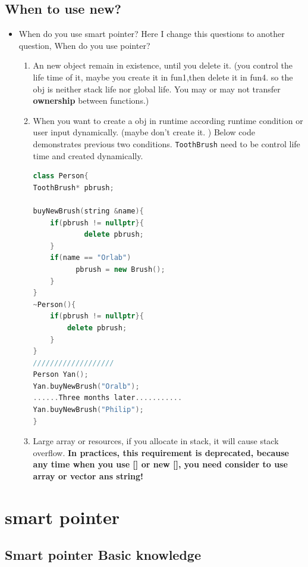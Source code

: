 \documentclass[a4paper,12pt,twoside]{book}
\begin{document}
\subsection{When to use new?}
\begin{itemize}

\item When do you use smart pointer? Here I change this questions to another question, When do you use pointer?
\begin{enumerate}

\item An new object remain in existence, until you delete it. (you control the life time of it, maybe you create it in fun1,then delete it in fun4. so the obj is neither stack life nor global life. You may or may not transfer \textbf{ownership} between functions.)

\item When you want to create a obj in runtime according runtime condition or user input dynamically. (maybe don't create it. ) Below code demonstrates previous two conditions.  \texttt{ToothBrush} need to be control life time and created dynamically.

\begin{lstlisting}[frame=single, language=c++]
class Person{
ToothBrush* pbrush;

buyNewBrush(string &name){
    if(pbrush != nullptr}{
	    	delete pbrush;
    }
    if(name == "Orlab")
          pbrush = new Brush();
    }
}
~Person(){
	if(pbrush != nullptr}{
		delete pbrush;
    }
}
///////////////////
Person Yan();
Yan.buyNewBrush("Oralb");
......Three months later...........
Yan.buyNewBrush("Philip");
}
\end{lstlisting}

\item Large array or resources,  if you allocate in stack, it will cause stack overflow. \textbf{In practices, this requirement is deprecated, because any time when you use [] or new [], you need consider to use array or vector ans string!}
\end{enumerate}

\end{itemize}

\section{smart pointer}

\subsection{Smart pointer Basic knowledge}
\end{document}
